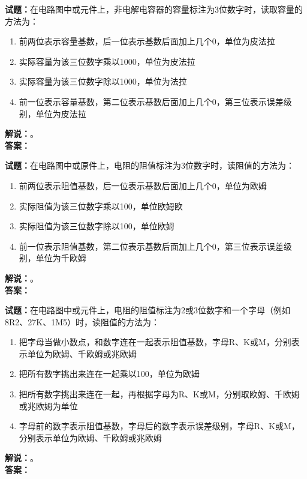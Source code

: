 \documentclass{ctexbook}
\begin{document}
\bigskip




\noindent\textbf{试题：}在电路图中或元件上，非电解电容器的容量标注为3位数字时，读取容量的方法为：
\begin{enumerate}[leftmargin=3em]
\item 前两位表示容量基数，后一位表示基数后面加上几个0，单位为皮法拉
\item 实际容量为该三位数字乘以1000，单位为皮法拉
\item 实际容量为该三位数字除以1000，单位为法拉
\item 前一位表示容量基数，第二位表示基数后面加上几个0，第三位表示误差级别，单位为皮法拉
\end{enumerate}
\noindent\textbf{解说：}\textbf{}。\\\noindent\textbf{答案：}

\bigskip




\noindent\textbf{试题：}在电路图中或原件上，电阻的阻值标注为3位数字时，读阻值的方法为：
\begin{enumerate}[leftmargin=3em]
\item 前两位表示阻值基数，后一位表示基数后面加上几个0，单位为欧姆
\item 实际阻值为该三位数字乘以100，单位欧姆欧
\item 实际阻值为该三位数字除以100，单位欧姆
\item 前一位表示阻值基数，第二位表示基数后面加上几个0，第三位表示误差级别，单位为千欧姆
\end{enumerate}
\noindent\textbf{解说：}\textbf{}。\\\noindent\textbf{答案：}

\bigskip




\noindent\textbf{试题：}在电路图中或元件上，电阻的阻值标注为2或3位数字和一个字母（例如8R2、27K、1M5）时，读阻值的方法为：
\begin{enumerate}[leftmargin=3em]
\item 把字母当做小数点，和数字连在一起表示阻值基数，字母R、K或M，分别表示单位为欧姆、千欧姆或兆欧姆
\item 把所有数字挑出来连在一起乘以100，单位为欧姆
\item 把所有数字挑出来连在一起，再根据字母为R、K或M，分别取欧姆、千欧姆或兆欧姆为单位
\item 字母前的数字表示阻值基数，字母后的数字表示误差级别，字母R、K或M，分别表示单位为欧姆、千欧姆或兆欧姆
\end{enumerate}
\noindent\textbf{解说：}\textbf{}。\\\noindent\textbf{答案：}
\end{document}
